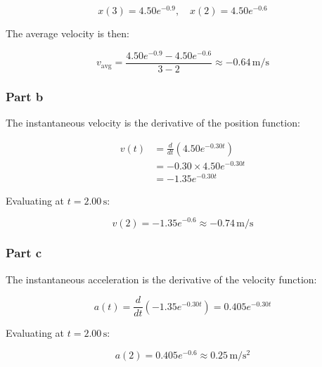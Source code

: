 \documentclass{article}
\newcommand{\meter}{\text{m}}
\newcommand{\second}{\text{s}}
\begin{document}
\[
x(3) = 4.50e^{-0.9}, \quad x(2) = 4.50e^{-0.6}
\]

The average velocity is then:

\[
v_{\text{avg}} = \frac{4.50e^{-0.9} - 4.50e^{-0.6}}{3 - 2} \approx -0.64 \, \si{\meter\per\second}
\]

\subsubsection*{Part b}
The instantaneous velocity is the derivative of the position function:

\begin{align*}
v(t) &= \frac{d}{dt} \left( 4.50e^{-0.30t} \right) \\
&= -0.30 \times 4.50e^{-0.30t} \\
&= -1.35e^{-0.30t}
\end{align*}

Evaluating at \( t = 2.00 \, \si{\second} \):

\[
v(2) = -1.35e^{-0.6} \approx -0.74 \, \si{\meter\per\second}
\]

\subsubsection*{Part c}
The instantaneous acceleration is the derivative of the velocity function:

\[
a(t) = \frac{d}{dt} \left( -1.35e^{-0.30t} \right) = 0.405e^{-0.30t}
\]

Evaluating at \( t = 2.00 \, \si{\second} \):

\[
a(2) = 0.405e^{-0.6} \approx 0.25 \, \si{\meter\per\second^2}
\]
\end{document}
